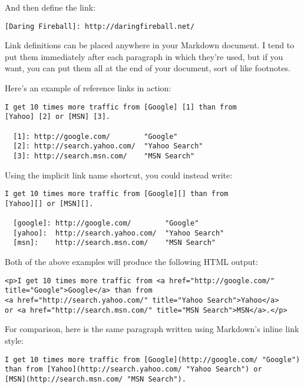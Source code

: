 And then define the link:

\begin{lstlisting}
[Daring Fireball]: http://daringfireball.net/
\end{lstlisting}




Link definitions can be placed anywhere in your Markdown document. I
tend to put them immediately after each paragraph in which they're
used, but if you want, you can put them all at the end of your
document, sort of like footnotes.



Here's an example of reference links in action:

\begin{lstlisting}
I get 10 times more traffic from [Google] [1] than from
[Yahoo] [2] or [MSN] [3].

  [1]: http://google.com/        "Google"
  [2]: http://search.yahoo.com/  "Yahoo Search"
  [3]: http://search.msn.com/    "MSN Search"
\end{lstlisting}




Using the implicit link name shortcut, you could instead write:

\begin{lstlisting}
I get 10 times more traffic from [Google][] than from
[Yahoo][] or [MSN][].

  [google]: http://google.com/        "Google"
  [yahoo]:  http://search.yahoo.com/  "Yahoo Search"
  [msn]:    http://search.msn.com/    "MSN Search"
\end{lstlisting}




Both of the above examples will produce the following HTML output:

\begin{lstlisting}
<p>I get 10 times more traffic from <a href="http://google.com/"
title="Google">Google</a> than from
<a href="http://search.yahoo.com/" title="Yahoo Search">Yahoo</a>
or <a href="http://search.msn.com/" title="MSN Search">MSN</a>.</p>
\end{lstlisting}




For comparison, here is the same paragraph written using
Markdown's inline link style:

\begin{lstlisting}
I get 10 times more traffic from [Google](http://google.com/ "Google")
than from [Yahoo](http://search.yahoo.com/ "Yahoo Search") or
[MSN](http://search.msn.com/ "MSN Search").
\end{lstlisting}




